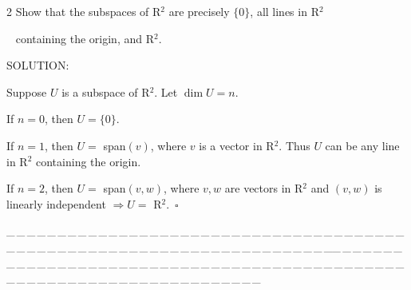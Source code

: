 \documentclass[a4paper, 11pt, UTF8]{article}
\begin{document}
\begin{large}
{\timesbf\Large 2} {\timessl\Large 
Show that the subspaces of {\timesbf R}$^2$ are precisely $\{0\}$, all lines in {\timesbf R}$^2$}\par\,\,\,
{\timessl\Large containing the origin, and {\timesbf R}$^2$.
}\par
{\timesbf S\footnotesize{OLUTION:}}\par\quad
Suppose $U$ is a subspace of {\timesbf R}$^2$. Let $\dim U=n.$\par\quad
If $n=0$, then $U=\{0\}.$\par\quad
If $n=1$, then $U=$ span$(v)$, where $v$ is a vector in {\timesbf R}$^2$. Thus $U$ can be any line in {\timesbf R}$^2$ containing the origin.\par\quad
If $n=2$, then $U=$ span$(v,w)$, where $v,w$ are vectors in {\timesbf R}$^2$ and $(v,w)$ is linearly independent $\Rightarrow U=$ {\timesbf R}$^2.\,\,\,\square$\par
{\tiny \_\,\_\,\_\,\_\,\_\,\_\,\_\,\_\,\_\,\_\,\_\,\_\,\_\,\_\,\_\,\_\,\_\,\_\,\_\,\_\,\_\,\_\,\_\,\_\,\_\,\_\,\_\,\_\,\_\,\_\,\_\,\_\,\_\,\_\,\_\,\_\,\_\,\_\,\_\,\_\,\_\,\_\,\_\,\_\,\_\,\_\,\_\,\_\,\_\,\_\,\_\,\_\,\_\,\_\,\_\,\_\,\_\,\_\,\_\,\_\,\_\,\_\,\_\,\_\,\_\,\_\,\_\,\_\,\_\,\_\,\_\_\,\_\,\_\,\_\,\_\,\_\,\_\,\_\,\_\,\_\,\_\,\_\,\_\,\_\,\_\,\_\,\_\,\_\,\_\,\_\,\_\,\_\,\_\,\_\,\_\,\_\,\_\,\_\,\_\,\_\,\_\,\_\,\_\,\_\,\_\,\_\,\_\,\_\,\_\,\_\,\_\,\_\,\_\,\_\,\_\,\_\,\_\,\_\,\_\,\_\,\_\,\_\,\_\,\_\,\_\,\_\,\_\,\_\,\_\,\_\,\_\,\_\,\_\,\_\,\_\,\_\,\_\,\_\,\_\,\_\,\_}\par


\end{large}
\end{document}
